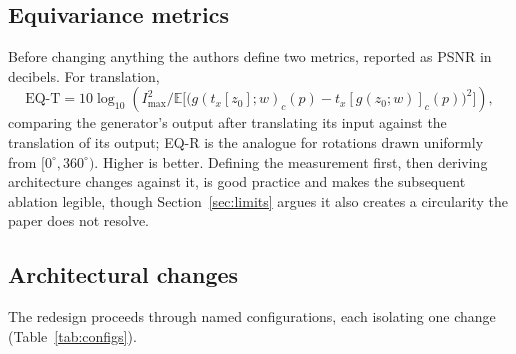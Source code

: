 \documentclass[11pt,a4paper]{article}
\begin{document}
\subsection{Equivariance metrics}

Before changing anything the authors define two metrics, reported as PSNR in
decibels. For translation,
\begin{equation}
\text{EQ-T} = 10\log_{10}\!\left(
I_{\max}^{2} \big/
\mathbb{E}\Big[\big(g(t_x[z_0];w)_c(p) - t_x[g(z_0;w)]_c(p)\big)^{2}\Big]\right),
\end{equation}
comparing the generator's output after translating its input against the
translation of its output; EQ-R is the analogue for rotations drawn uniformly
from $[0^\circ,360^\circ)$. Higher is better. Defining the measurement first, then
deriving architecture changes against it, is good practice and makes the
subsequent ablation legible, though Section~\ref{sec:limits} argues it also creates a
circularity the paper does not resolve.

\subsection{Architectural changes}

The redesign proceeds through named configurations, each isolating one change
(Table~\ref{tab:configs}).
\end{document}
